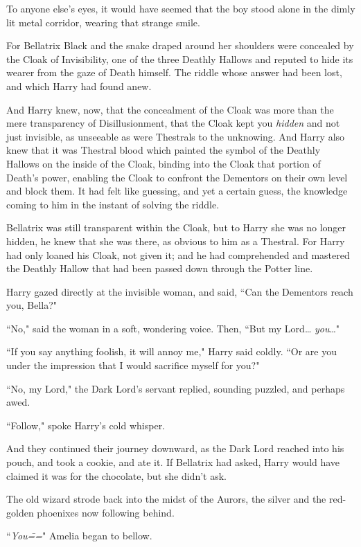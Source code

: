 To anyone else's eyes, it would have seemed that the boy stood alone in the dimly lit metal corridor, wearing that strange smile.

For Bellatrix Black and the snake draped around her shoulders were concealed by the Cloak of Invisibility, one of the three Deathly Hallows and reputed to hide its wearer from the gaze of Death himself. The riddle whose answer had been lost, and which Harry had found anew.

And Harry knew, now, that the concealment of the Cloak was more than the mere transparency of Disillusionment, that the Cloak kept you \emph{hidden} and not just invisible, as unseeable as were Thestrals to the unknowing. And Harry also knew that it was Thestral blood which painted the symbol of the Deathly Hallows on the inside of the Cloak, binding into the Cloak that portion of Death's power, enabling the Cloak to confront the Dementors on their own level and block them. It had felt like guessing, and yet a certain guess, the knowledge coming to him in the instant of solving the riddle.

Bellatrix was still transparent within the Cloak, but to Harry she was no longer hidden, he knew that she was there, as obvious to him as a Thestral. For Harry had only loaned his Cloak, not given it; and he had comprehended and mastered the Deathly Hallow that had been passed down through the Potter line.

Harry gazed directly at the invisible woman, and said, ``Can the Dementors reach you, Bella?"

``No," said the woman in a soft, wondering voice. Then, ``But my Lord{\ldots} \emph{you}{\ldots}"

``If you say anything foolish, it will annoy me," Harry said coldly. ``Or are you under the impression that I would sacrifice myself for you?"

``No, my Lord," the Dark Lord's servant replied, sounding puzzled, and perhaps awed.

``Follow," spoke Harry's cold whisper.

And they continued their journey downward, as the Dark Lord reached into his pouch, and took a cookie, and ate it. If Bellatrix had asked, Harry would have claimed it was for the chocolate, but she didn't ask.

\later

The old wizard strode back into the midst of the Aurors, the silver and the red-golden phoenixes now following behind.

``\emph{You\===}" Amelia began to bellow.

